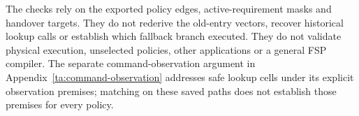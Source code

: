 The checks rely on the exported policy edges, active-requirement masks and handover targets. They do not rederive the old-entry vectors, recover historical lookup calls or establish which fallback branch executed. They do not validate physical execution, unselected policies, other applications or a general FSP compiler. The separate command-observation argument in Appendix~\ref{ta:command-observation} addresses safe lookup cells under its explicit observation premises; matching on these saved paths does not establish those premises for every policy.
\FloatBarrier
